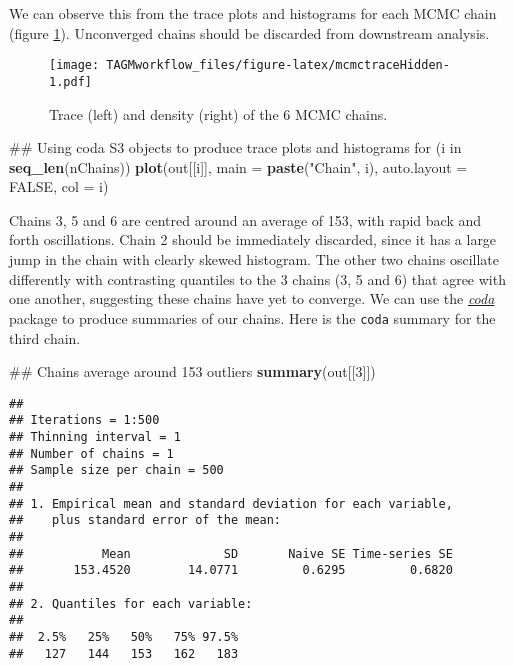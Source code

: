 \documentclass[]{article}
\newenvironment{Shaded}{\begin{snugshade}}{\end{snugshade}}
\newcommand{\KeywordTok}[1]{\textcolor[rgb]{0.13,0.29,0.53}{\textbf{{#1}}}}
\newcommand{\DataTypeTok}[1]{\textcolor[rgb]{0.13,0.29,0.53}{{#1}}}
\newcommand{\DecValTok}[1]{\textcolor[rgb]{0.00,0.00,0.81}{{#1}}}
\newcommand{\StringTok}[1]{\textcolor[rgb]{0.31,0.60,0.02}{{#1}}}
\newcommand{\OtherTok}[1]{\textcolor[rgb]{0.56,0.35,0.01}{{#1}}}
\newcommand{\NormalTok}[1]{{#1}}
\begin{document}
We can observe this from the trace plots and histograms for each MCMC
chain (figure \ref{fig:mcmctraceHidden}). Unconverged chains should be
discarded from downstream analysis.

\begin{figure}[htbp]
\centering
\texttt{[image: TAGMworkflow\_files/figure-latex/mcmctraceHidden-1.pdf]}
\caption{\label{fig:mcmctraceHidden}Trace (left) and density (right) of the
6 MCMC chains.}
\end{figure}

\begin{Shaded}
\begin{Highlighting}[]
\NormalTok{## Using coda S3 objects to produce trace plots and histograms}
\NormalTok{for (i in }\KeywordTok{seq_len}\NormalTok{(nChains))}
    \KeywordTok{plot}\NormalTok{(out[[i]], }\DataTypeTok{main =} \KeywordTok{paste}\NormalTok{(}\StringTok{"Chain"}\NormalTok{, i), }\DataTypeTok{auto.layout =} \OtherTok{FALSE}\NormalTok{, }\DataTypeTok{col =} \NormalTok{i)}
\end{Highlighting}
\end{Shaded}

Chains 3, 5 and 6 are centred around an average of 153, with rapid back
and forth oscillations. Chain 2 should be immediately discarded, since
it has a large jump in the chain with clearly skewed histogram. The
other two chains oscillate differently with contrasting quantiles to the
3 chains (3, 5 and 6) that agree with one another, suggesting these
chains have yet to converge. We can use the
\emph{\href{https://CRAN.R-project.org/package=coda}{coda}} package to
produce summaries of our chains. Here is the \texttt{coda} summary for
the third chain.

\begin{Shaded}
\begin{Highlighting}[]
\NormalTok{## Chains average around 153 outliers}
\KeywordTok{summary}\NormalTok{(out[[}\DecValTok{3}\NormalTok{]])}
\end{Highlighting}
\end{Shaded}

\begin{verbatim}
## 
## Iterations = 1:500
## Thinning interval = 1 
## Number of chains = 1 
## Sample size per chain = 500 
## 
## 1. Empirical mean and standard deviation for each variable,
##    plus standard error of the mean:
## 
##           Mean             SD       Naive SE Time-series SE 
##       153.4520        14.0771         0.6295         0.6820 
## 
## 2. Quantiles for each variable:
## 
##  2.5%   25%   50%   75% 97.5% 
##   127   144   153   162   183
\end{verbatim}
\end{document}
